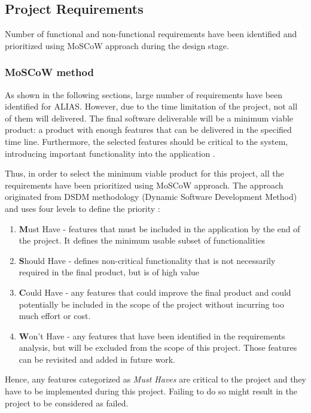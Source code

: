 \subsection{Project Requirements} \label{label:projectRequirements}
Number of functional and non-functional requirements have been identified and prioritized using MoSCoW approach during the design stage. 

\subsubsection{MoSCoW method}
As shown in the following sections, large number of requirements have been identified for ALIAS. However, due to the time limitation of the project, not all of them will delivered. The final software deliverable will be a minimum viable product: a product with enough features that can be delivered in the specified time line. Furthermore, the selected features should be critical to the system, introducing important functionality into the application \citep{mvp}.

Thus, in order to select the minimum viable product for this project, all the requirements have been prioritized using MoSCoW approach. The approach originated from DSDM methodology (Dynamic Software Development Method) and uses four levels to define the priority \citep{moscow}:

\begin{enumerate}
	\item \textbf{M}ust Have - features that must be included in the application by the end of the project. It defines the minimum usable subset of functionalities 
	\item \textbf{S}hould Have - defines non-critical functionality that is not necessarily required in the final product, but is of high value
	\item \textbf{C}ould Have - any features that could improve the final product and could potentially be included in the scope of the project without incurring too much effort or cost.
	\item \textbf{W}on't Have - any features that have been identified in the requirements analysis, but will be excluded from the scope of this project. Those features can be revisited and added in future work.
\end{enumerate}

Hence, any features categorized as \textit{Must Haves} are critical to the project and they have to be implemented during this project. Failing to do so might result in the project to be considered as failed. 

